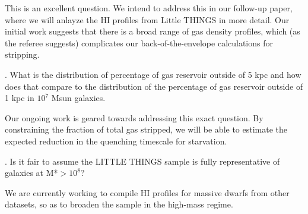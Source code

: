 \documentclass[11pt, preprint]{aastex}
\begin{document}
\indent \parbox{5.5in}{This is an excellent question. We intend to address this in our follow-up paper, where we will anlayze the HI profiles from Little THINGS in more detail. Our initial work suggests that there is a broad range of gas density profiles, which (as the referee suggests) complicates our back-of-the-envelope calculations for stripping.}

. What is the distribution of percentage of gas reservoir outside of 5 kpc and how does that compare to the distribution of the percentage of gas reservoir outside of 1 kpc in $10^7$ Msun galaxies.

\indent \parbox{5.5in}{Our ongoing work is geared towards addressing this exact question. By constraining the fraction of total gas stripped, we will be able to estimate the expected reduction in the quenching timescale for starvation.}

. Is it fair to assume the LITTLE THINGS sample is fully representative of galaxies at M*$>10^8$? 

\indent \parbox{5.5in}{We are currently working to compile HI profiles for massive dwarfs from other datasets, so as to broaden the sample in the high-mass regime.}






\vspace*{0.2in}
\end{document}
